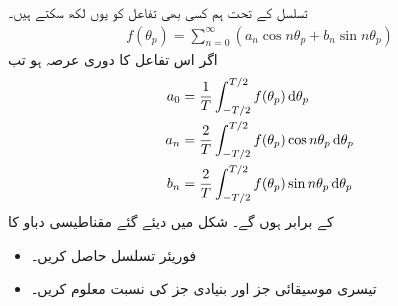  تسلسل کے تحت ہم کسی بھی تفاعل   کو یوں لکھ سکتے ہیں۔
\begin{align}
f(\theta_p)=\sum_{n=0}^{\infty} (a_n \cos n \theta_p +b_n \sin n \theta_p)
\end{align}
اگر اس تفاعل کا دوری عرصہ  ہو تب
\begin{gather}
\begin{aligned}\label{مساوات_گھومتے_مشین_فورئر_تسلسل_جزو}
a_0&=\frac{1}{T} \int_{-T/2}^{T/2} f(\theta_p) \dif \theta_p\\
a_n&=\frac{2}{T} \int_{-T/2}^{T/2} f(\theta_p) \cos n \theta_p \dif \theta_p\\
b_n&=\frac{2}{T} \int_{-T/2}^{T/2} f(\theta_p) \sin n \theta_p \dif \theta_p
\end{aligned}
\end{gather}
کے برابر ہوں گے۔
%
شکل   میں دیئے گئے مقناطیسی دباو کا
\begin{itemize}
\item
فوریئر تسلسل حاصل کریں۔
\item
تیسری موسیقائی جز اور بنیادی جز کی نسبت معلوم کریں۔
\end{itemize}

